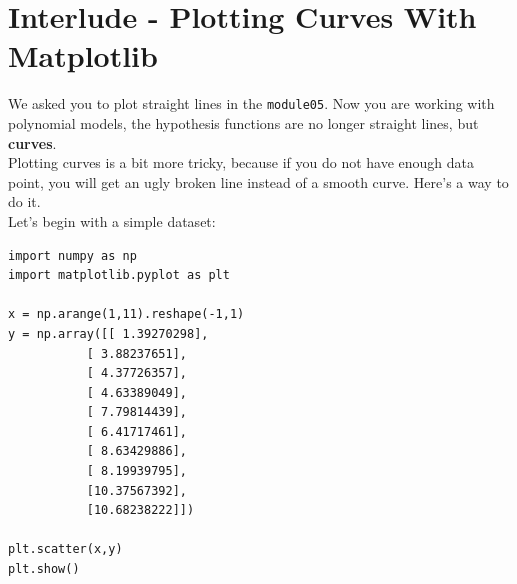 
\section*{Interlude - Plotting Curves With Matplotlib}

We asked you to plot straight lines in the \texttt{module05}.
Now you are working with polynomial models, the hypothesis functions are no longer straight lines, but \textbf{curves}.\\
\newline
Plotting curves is a bit more tricky, because if you do not have enough data point, you will get an ugly broken line instead of a smooth curve.
Here's a way to do it.\\
\newline
Let's begin with a simple dataset:

\begin{verbatim}
import numpy as np
import matplotlib.pyplot as plt

x = np.arange(1,11).reshape(-1,1)
y = np.array([[ 1.39270298],
           [ 3.88237651],
           [ 4.37726357],
           [ 4.63389049],
           [ 7.79814439],
           [ 6.41717461],
           [ 8.63429886],
           [ 8.19939795],
           [10.37567392],
           [10.68238222]])

plt.scatter(x,y)
plt.show()
\end{verbatim}

